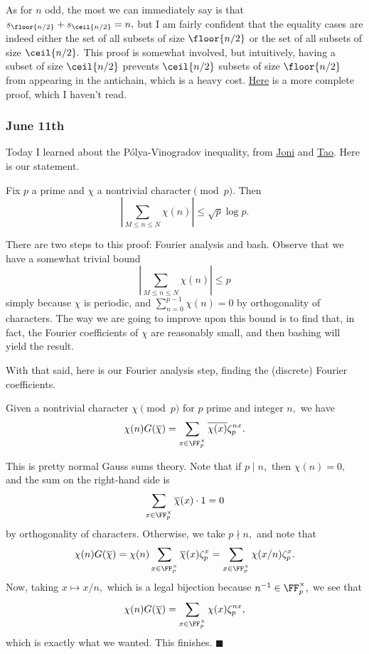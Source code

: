 As for $n$ odd, the most we can immediately say is that $s_{\floor{n/2}}+s_{\ceil{n/2}}=n,$ but I am fairly confident that the equality cases are indeed either the set of all subsets of size $\floor{n/2}$ or the set of all subsets of size $\ceil{n/2}.$ This proof is somewhat involved, but intuitively, having a subset of size $\ceil{n/2}$ prevents $\ceil{n/2}$ subsets of size $\floor{n/2}$ from appearing in the antichain, which is a heavy cost. \href{https://www.whitman.edu/mathematics/cgt_online/book/section01.07.html}{Here} is a more complete proof, which I haven't read.

\subsubsection{June 11th}
Today I learned about the P\'olya-Vinogradov inequality, from \href{http://jonismathnotes.blogspot.com/2014/10/character-sums-and-polya-vinogradov.html}{Joni} and \href{https://terrytao.wordpress.com/2009/08/18/the-least-quadratic-nonresidue-and-the-square-root-barrier/#more-2664}{Tao}. Here is our statement.
\begin{theorem}
    Fix $p$ a prime and $\chi$ a nontrivial character$\pmod p.$ Then
    \[\left|\sum_{M\le n\le N}\chi(n)\right|\le\sqrt p\log p.\]
\end{theorem}
There are two steps to this proof: Fourier analysis and bash. Observe that we have a somewhat trivial bound
\[\left|\sum_{M\le n\le N}\chi(n)\right|\le p\]
simply because $\chi$ is periodic, and $\sum_{n=0}^{p-1}\chi(n)=0$ by orthogonality of characters. The way we are going to improve upon this bound is to find that, in fact, the Fourier coefficients of $\chi$ are reasonably small, and then bashing will yield the result.

With that said, here is our Fourier analysis step, finding the (discrete) Fourier coefficients. \begin{lemma}
    Given a nontrivial character $\chi\pmod p$ for $p$ prime and integer $n,$ we have
    \[\chi(n)G(\overline\chi)=\sum_{x\in\FF_p^\times}\overline{\chi(x)}\zeta_p^{nx}.\]
\end{lemma}
This is pretty normal Gauss sums theory. Note that if $p\mid n,$ then $\chi(n)=0,$ and the sum on the right-hand side is
\[\sum_{x\in\FF_p^\times}\overline\chi(x)\cdot1=0\]
by orthogonality of characters. Otherwise, we take $p\nmid n,$ and note that
\[\chi(n)G(\overline\chi)=\chi(n)\sum_{x\in\FF_p^\times}\overline\chi(x)\zeta_p^x=\sum_{x\in\FF_p^\times}\chi(x/n)\zeta_p^x.\]
Now, taking $x\mapsto x/n,$ which is a legal bijection because $n^{-1}\in\FF_p^\times,$ we see that
\[\chi(n)G(\overline\chi)=\sum_{x\in\FF_p^\times}\chi(x)\zeta_p^{nx},\]
which is exactly what we wanted. This finishes. $\blacksquare$


